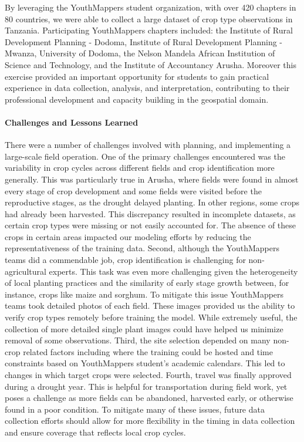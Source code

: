 \documentclass[
  journal,
  twocolumn]{IEEEtran}
\begin{document}
By leveraging the YouthMappers student organization, with over 420
chapters in 80 countries, we were able to collect a large dataset of
crop type observations in Tanzania. Participating YouthMappers chapters
included: the Institute of Rural Development Planning - Dodoma,
Institute of Rural Development Planning - Mwanza, University of Dodoma,
the Nelson Mandela African Institution of Science and Technology, and
the Institute of Accountancy Arusha. Moreover this exercise provided an
important opportunity for students to gain practical experience in data
collection, analysis, and interpretation, contributing to their
professional development and capacity building in the geospatial domain.

\hypertarget{challenges-and-lessons-learned}{%
\paragraph{Challenges and Lessons
Learned}\label{challenges-and-lessons-learned}}

There were a number of challenges involved with planning, and
implementing a large-scale field operation. One of the primary
challenges encountered was the variability in crop cycles across
different fields and crop identification more generally. This was
particularly true in Arusha, where fields were found in almost every
stage of crop development and some fields were visited before the
reproductive stages, as the drought delayed planting. In other regions,
some crops had already been harvested. This discrepancy resulted in
incomplete datasets, as certain crop types were missing or not easily
accounted for. The absence of these crops in certain areas impacted our
modeling efforts by reducing the representativeness of the training
data. Second, although the YouthMappers teams did a commendable job,
crop identification is challenging for non-agricultural experts. This
task was even more challenging given the heterogeneity of local planting
practices and the similarity of early stage growth between, for
instance, crops like maize and sorghum. To mitigate this issue
YouthMappers teams took detailed photos of each field. These images
provided us the ability to verify crop types remotely before training
the model. While extremely useful, the collection of more detailed
single plant images could have helped us minimize removal of some
observations. Third, the site selection depended on many non-crop
related factors including where the training could be hosted and time
constraints based on YouthMappers student's academic calendars. This led
to changes in which target crops were selected. Fourth, travel was
finally approved during a drought year. This is helpful for
transportation during field work, yet poses a challenge as more fields
can be abandoned, harvested early, or otherwise found in a poor
condition. To mitigate many of these issues, future data collection
efforts should allow for more flexibility in the timing in data
collection and ensure coverage that reflects local crop cycles.
\end{document}
